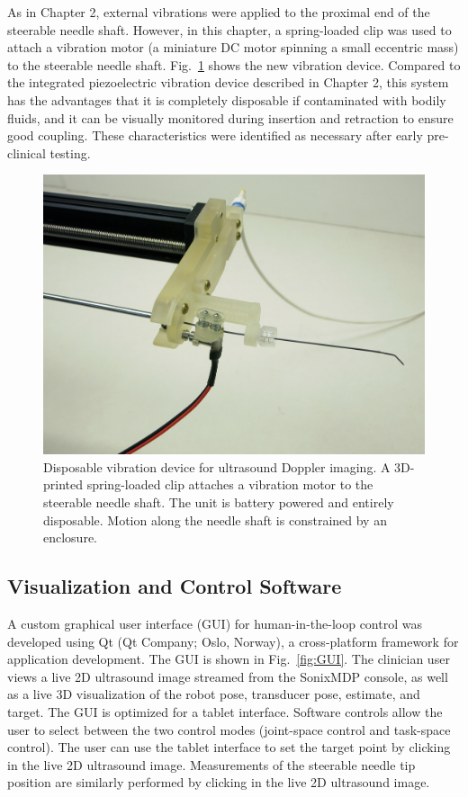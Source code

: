 As in Chapter 2, external vibrations were applied to the proximal end of the steerable needle shaft. However, in this chapter, a spring-loaded clip was used to attach a vibration motor (a miniature DC motor spinning a small eccentric mass) to the steerable needle shaft. Fig.~\ref{fig:Buzzer} shows the new vibration device. Compared to the integrated piezoelectric vibration device described in Chapter 2, this system has the advantages that it is completely disposable if contaminated with bodily fluids, and it can be visually monitored during insertion and retraction to ensure good coupling. These characteristics were identified as necessary after early pre-clinical testing.

\begin{figure}[!t]
\centering
\includegraphics[width = 0.6\columnwidth]{./Images/Chapter5/Buzzer/Buzzer.jpg}%
\caption[Disposable vibration device]{Disposable vibration device for ultrasound Doppler imaging. A 3D-printed spring-loaded clip attaches a vibration motor to the steerable needle shaft. The unit is battery powered and entirely disposable. Motion along the needle shaft is constrained by an enclosure.}
\label{fig:Buzzer}
\end{figure}  

\subsection{Visualization and Control Software}
A custom graphical user interface (GUI) for human-in-the-loop control was developed using Qt (Qt Company; Oslo, Norway), a cross-platform framework for application development. The GUI is shown in Fig.~\ref{fig:GUI}. The clinician user views a live 2D ultrasound image streamed from the SonixMDP console, as well as a live 3D visualization of the robot pose, transducer pose, estimate, and target. The GUI is optimized for a tablet interface. Software controls allow the user to select between the two control modes (joint-space control and task-space control). The user can use the tablet interface to set the target point by clicking in the live 2D ultrasound image. Measurements of the steerable needle tip position are similarly performed by clicking in the live 2D ultrasound image. 


